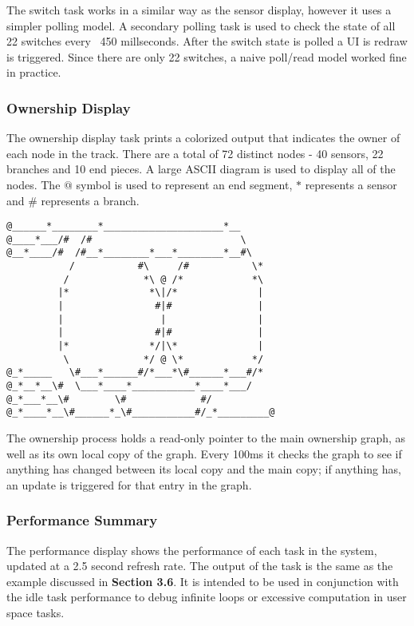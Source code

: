 \documentclass[twoside,a4paper]{refart}
\begin{document}
The switch task works in a similar way as the sensor display, however it uses a simpler polling model. A secondary polling task is used to check the state of all 22 switches every ~450 millseconds. After the switch state is polled a UI is redraw is triggered. Since there are only 22 switches, a naive poll/read model worked fine in practice.

\subsubsection{Ownership Display}

The ownership display task prints a colorized output that indicates the owner of each node in the track. There are a total of 72 distinct nodes - 40 sensors, 22 branches and 10 end pieces. A large ASCII diagram is used to display all of the nodes. The $@$ symbol is used to represent an end segment, $*$ represents a sensor and $\#$ represents a branch.

\begin{verbatim}
@______*________*_____________________*__
@____*___/#  /#                          \
@__*____/#  /#__*________*___*________*__#\
           /           #\     /#           \*
          /             *\ @ /*            *\
         |*              *\|/*              |
         |                #|#               |
         |                 |                |
         |                #|#               |
         |*              */|\*              |
          \             */ @ \*            */
@_*_____   \#___*______#/*___*\#______*___#/*
@_*__*__\#  \___*____*___________*____*___/
@_*___*__\#        \#             #/  
@_*____*__\#______*_\#___________#/_*_________@
\end{verbatim}

The ownership process holds a read-only pointer to the main ownership graph, as well as its own local copy of the graph. Every 100ms it checks the graph to see if anything has changed between its local copy and the main copy; if anything has, an update is triggered for that entry in the graph.

\subsubsection{Performance Summary}

The performance display shows the performance of each task in the system, updated at a 2.5 second refresh rate. The output of the task is the same as the example discussed in \textbf{Section 3.6}. It is intended to be used in conjunction with the idle task performance to debug infinite loops or excessive computation in user space tasks.
\end{document}
